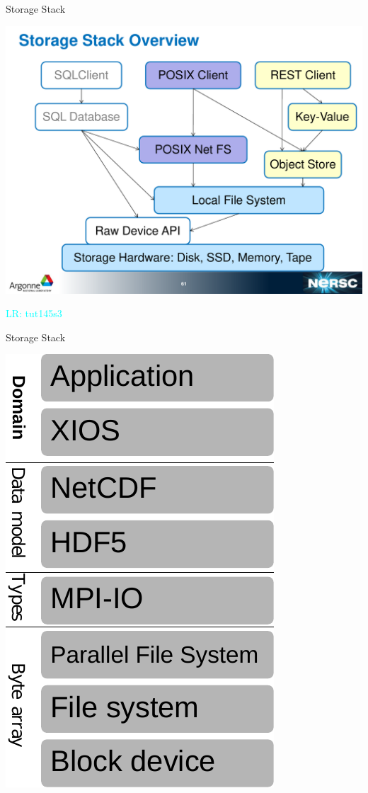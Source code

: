 \documentclass[compress,11pt,xcolor=svgnames,aspectratio=169]{beamer}
\newcommand{\lr}[1]{\textcolor{cyan}{LR: #1}}
\begin{document}
\begin{frame}[t]{Storage Stack}

\begin{center}
\includegraphics[scale=0.3]{fig/storage-stack}
\end{center}

\lr{tut145s3}

\end{frame}

\begin{frame}[t]{Storage Stack}

\begin{center}
\includegraphics[scale=0.5]{fig/layers-xios}
\end{center}

\nocite{JSFI309}

\end{frame}
\end{document}
